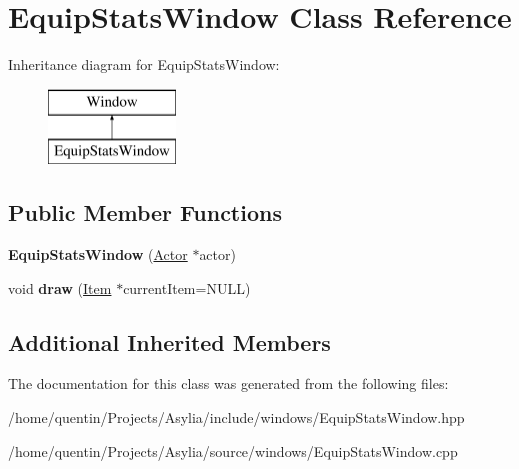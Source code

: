 \hypertarget{classEquipStatsWindow}{\section{Equip\-Stats\-Window Class Reference}
\label{classEquipStatsWindow}
}
Inheritance diagram for Equip\-Stats\-Window\-:\begin{figure}[H]
\begin{center}
\leavevmode
\includegraphics[height=2.000000cm]{classEquipStatsWindow}
\end{center}
\end{figure}
\subsection*{Public Member Functions}
\begin{DoxyCompactItemize}
\item 
\hypertarget{classEquipStatsWindow_a3508019a8b50760ba691cbe35d4c2677}{{\bfseries Equip\-Stats\-Window} (\hyperlink{classActor}{Actor} $\ast$actor)}\label{classEquipStatsWindow_a3508019a8b50760ba691cbe35d4c2677}

\item 
\hypertarget{classEquipStatsWindow_abda3ae8a8a60b3070d77ae7ed0a428df}{void {\bfseries draw} (\hyperlink{classItem}{Item} $\ast$current\-Item=N\-U\-L\-L)}\label{classEquipStatsWindow_abda3ae8a8a60b3070d77ae7ed0a428df}

\end{DoxyCompactItemize}
\subsection*{Additional Inherited Members}


The documentation for this class was generated from the following files\-:\begin{DoxyCompactItemize}
\item 
/home/quentin/\-Projects/\-Asylia/include/windows/Equip\-Stats\-Window.\-hpp\item 
/home/quentin/\-Projects/\-Asylia/source/windows/Equip\-Stats\-Window.\-cpp\end{DoxyCompactItemize}
